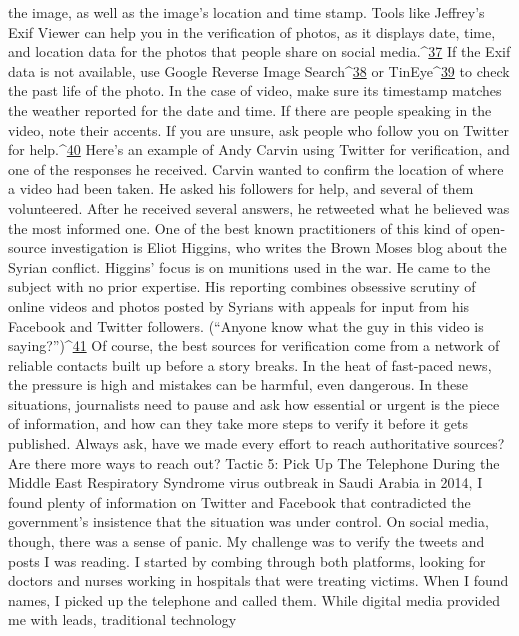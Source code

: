 the image, as well as the image’s location and time stamp. Tools like Jeffrey’s Exif
Viewer can help you in the verification of photos, as it displays date, time, and location
data for the photos that people share on social media.^{\href{#endnotes}{37}} If the Exif data is not available,
use Google Reverse Image Search^{\href{#endnotes}{38}} or TinEye^{\href{#endnotes}{39}} to check the past life of the photo.
In the case of video, make sure its timestamp matches the weather reported for the date
and time. If there are people speaking in the video, note their accents. If you are unsure,
ask people who follow you on Twitter for help.^{\href{#endnotes}{40}} Here’s an example of Andy Carvin
using Twitter for verification, and one of the responses he received.
Carvin wanted to confirm the location of where a video had been taken. He asked his
followers for help, and several of them volunteered. After he received several answers, he
retweeted what he believed was the most informed one.
One of the best known practitioners of this kind of open-source investigation is Eliot
Higgins, who writes the Brown Moses blog about the Syrian conflict. Higgins’ focus is on
munitions used in the war. He came to the subject with no prior expertise. His reporting
combines obsessive scrutiny of online videos and photos posted by Syrians with appeals
for input from his Facebook and Twitter followers. (``Anyone know what the guy in this
video is saying?'')^{\href{#endnotes}{41}}
Of course, the best sources for verification come from a network of reliable contacts built
up before a story breaks. In the heat of fast-paced news, the pressure is high and mistakes
can be harmful, even dangerous. In these situations, journalists need to pause and ask
how essential or urgent is the piece of information, and how can they take more steps to
verify it before it gets published. Always ask, have we made every effort to reach
authoritative sources? Are there more ways to reach out?
Tactic 5: Pick Up The Telephone
During the Middle East Respiratory Syndrome virus outbreak in Saudi Arabia in 2014, I
found plenty of information on Twitter and Facebook that contradicted the government’s
insistence that the situation was under control. On social media, though, there was a sense
of panic. My challenge was to verify the tweets and posts I was reading.
I started by combing through both platforms, looking for doctors and nurses working in
hospitals that were treating victims. When I found names, I picked up the telephone and
called them. While digital media provided me with leads, traditional technology
